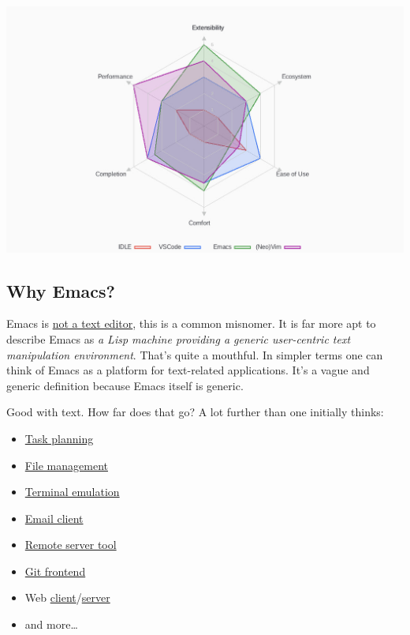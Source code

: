 \documentclass{scrartcl}
\begin{document}
\begin{center}
\includegraphics[width=.9\linewidth]{./misc/editor-comparison.jpeg}
\end{center}
\subsection{Why Emacs?}
\label{sec:org6bb2ef0}

Emacs is \href{https://www.eigenbahn.com/2020/01/12/emacs-is-no-editor}{not a text editor}, this is a common misnomer. It is far more apt to
describe Emacs as \emph{a Lisp machine providing a generic user-centric text
manipulation environment}. That's quite a mouthful.
In simpler terms one can think of Emacs as a platform for text-related
applications. It's a vague and generic definition because Emacs itself is
generic.

Good with text. How far does that go? A lot further than one initially thinks:
\begin{itemize}
\item \href{https://orgmode.org/}{Task planning}
\item \href{https://www.gnu.org/software/emacs/manual/html\_node/emacs/Dired.html}{File management}
\item \href{https://github.com/akermu/emacs-libvterm}{Terminal emulation}
\item \href{https://www.djcbsoftware.nl/code/mu/mu4e.html}{Email client}
\item \href{https://www.gnu.org/software/tramp/}{Remote server tool}
\item \href{https://magit.vc/}{Git frontend}
\item Web \href{https://github.com/pashky/restclient.el}{client}/\href{https://github.com/skeeto/emacs-web-server}{server}
\item and more\ldots{}
\end{itemize}
\end{document}
